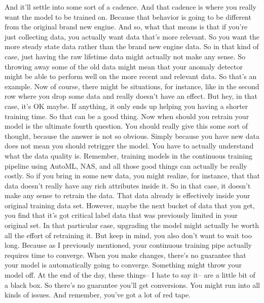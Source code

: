{{{{{{{{     And it'll settle into some sort of a cadence.
     And that cadence is where you really want the model to be trained on.
     Because that behavior is going to be different from the original brand
     new engine.
     And so, what that means is that if you're just collecting data,
     you actually want data that's more relevant.
     So you want the more steady state data rather than the brand new engine data.
     So in that kind of case, just having the raw lifetime
     data might actually not make any sense.
     So throwing away some of the old data might
     mean that your anomaly detector might be able to perform well
     on the more recent and relevant data.
     So that's an example.
     Now of course, there might be situations, for instance,
     like in the second row where you drop some data
     and really doesn't have an effect.
     But hey, in that case, it's OK maybe.
     If anything, it only ends up helping you having a shorter training time.
     So that can be a good thing.
     Now when should you retrain your model is the ultimate fourth question.
     You should really give this some sort of thought,
     because the answer is not so obvious.
     Simply because you have new data does not
     mean you should retrigger the model.
     You have to actually understand what the data quality is.
     Remember, training models in the continuous training pipeline
     using AutoML, NAS, and all those good things can actually be really costly.
     So if you bring in some new data, you might realize, for instance,
     that that data doesn't really have any rich attributes inside it.
     So in that case, it doesn't make any sense to retrain the data.
     That data already is effectively inside your original training data set.
     However, maybe the next bucket of data that you get,
     you find that it's got critical label data that was previously
     limited in your original set.
     In that particular case, upgrading the model
     might actually be worth all the effort of retraining it.
     But keep in mind, you also don't want to wait too long.
     Because as I previously mentioned, your continuous training pipe
     actually requires time to converge.
     When you make changes, there's no guarantee
     that your model is automatically going to converge.
     Something might throw your model off.
     At the end of the day, these things--
     I hate to say it-- are a little bit of a black box.
     So there's no guarantee you'll get conversions.
     You might run into all kinds of issues.
     And remember, you've got a lot of red tape.
}}}}}}}}

